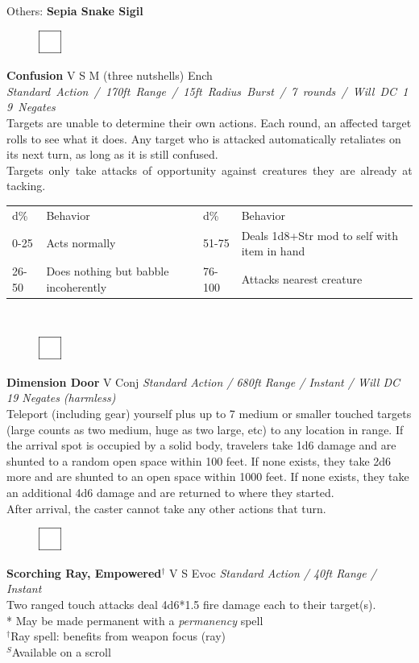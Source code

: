 \documentclass[letterpaper]{article}
\newcommand{\colhead}[0]{\footnotesize\itshape}
\newcommand{\e}[1]{\emph{#1}}
\newcommand{\B}[1]{\textbf{#1}}
\newcommand{\s}[0]{$^S$}
\newcommand{\D}[0]{$^\dag$}
\newcommand{\spell}[7]{
\begin{figure}
\vspace{-13pt}
\ifstrequal{#2}{Full}{  \includegraphics[width=2em]{Checkbox-Full}}{
\ifstrequal{#2}{Scroll}{\includegraphics[width=2em]{Checkbox-S}}{
                        \includegraphics[width=2em]{Checkbox}}}
\ifstrequal{#7}{}{\vspace{-1em}}{\vspace{#7}}
\end{figure}
 \B{#1} #3 {
    \ifstrequal{#4}{Conj}{\color{Plum}Conj}{%
    \ifstrequal{#4}{Divin}{\color{YellowOrange}Divin}{%
    \ifstrequal{#4}{Ench}{\color{VioletRed}Ench}{%
    \ifstrequal{#4}{Trans}{\color{LimeGreen}Trans}{%
    \ifstrequal{#4}{Evoc}{\color{RedOrange}Evoc}{%
    \ifstrequal{#4}{Illu}{\color{ProcessBlue}Illu}{%
    \ifstrequal{#4}{Abjur}{\color{CadetBlue}Abjur}{%
    \ifstrequal{#4}{Necro}{\color{Red}Necro}{%
}}}}}}}}}
{\footnotesize \e{#5}} \\
#6
}
\begin{document}
\begin{adjustwidth}{3em}{0em}
    Others: \B{Sepia Snake Sigil}\\
\end{adjustwidth}

\spell{Confusion}{}{V S M (three nutshells)}{Ench}{\mbox{Standard Action / 170ft Range / 15ft Radius Burst / 7 rounds / Will DC 19 Negates}}{
    Targets are unable to determine their own actions.  Each round, an affected target rolls to see what it does. Any target who is attacked automatically retaliates on its next turn, as long as it is still confused. \mbox{Targets only take attacks of opportunity against creatures they are already attacking.}\\
    \begin{tabu} to \textwidth{X[1] X[4] X[1] X[4]}
        \rowfont{\colhead}d\% & Behavior & d\% & Behavior\\
        \rowfont{\footnotesize}0-25 & Acts normally & 51-75 & Deals 1d8+Str mod to self with item in hand\\
        \rowfont{\footnotesize}26-50 & Does nothing but babble incoherently & 76-100 & Attacks nearest creature\\
    \end{tabu}}{2em}\\ %

\spell{Dimension Door}{}{V}{Conj}{Standard Action / 680ft Range / Instant / Will DC 19 Negates (harmless)}{
Teleport (including gear) yourself plus up to 7 medium or smaller touched targets (large counts as two medium, huge as two large, etc) to any location in range. If the arrival spot is occupied by a solid body, travelers take 1d6 damage and are shunted to a random open space within 100 feet.  If none exists, they take 2d6 more and are shunted to an open space within 1000 feet.  If none exists, they take an additional 4d6 damage and are returned to where they started.\\After arrival, the caster cannot take any other actions that turn.}{2em}\\[-1em]

\spell{Scorching Ray, Empowered\D}{}{V S}{Evoc}{Standard Action / 40ft Range / Instant}{%
Two ranged touch attacks deal 4d6*1.5 fire damage each to their target(s).}{}\\ %

* May be made permanent with a \e{permanency} spell \\
\D Ray spell: benefits from weapon focus (ray) \\
\s Available on a scroll
\end{document}
